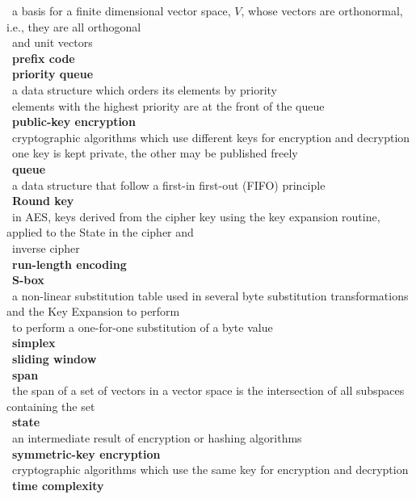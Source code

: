 \documentclass[10pt,letterpaper]{scrartcl}
\newcommand{\tbul}{\textbullet}
\newcommand{\tend}{\>\textendash}
\begin{document}
\begin{tabbing}
\begin{tabbing}
    \tend\ a basis for a finite dimensional vector space, $V$, whose vectors are orthonormal, i.e., they are all orthogonal \\ \>\ and unit vectors \\
\tbul\ \textbf{prefix code} \\
\tbul\ \textbf{priority queue} \\
    \tend\ a data structure which orders its elements by priority \\
    \tend\ elements with the highest priority are at the front of the queue \\
\tbul\ \textbf{public-key encryption} \\
    \tend\ cryptographic algorithms which use different keys for encryption and decryption \\
    \tend\ one key is kept private, the other may be published freely \\
\tbul\ \textbf{queue} \\
    \tend\ a data structure that follow a first-in first-out (FIFO) principle \\
\tbul\ \textbf{Round key} \\
    \tend\ in AES, keys derived from the cipher key using the key expansion routine, applied to the State in the cipher and \\ \>\ inverse cipher \\
\tbul\ \textbf{run-length encoding} \\
\tbul\ \textbf{S-box} \\
    \tend\ a non-linear substitution table used in several byte substitution transformations and the Key Expansion to perform \\ \>\ to perform a one-for-one substitution of a byte value \\
\tbul\ \textbf{simplex} \\
\tbul\ \textbf{sliding window} \\
\tbul\ \textbf{span} \\
    \tend\ the span of a set of vectors in a vector space is the intersection of all subspaces containing the set \\
\tbul\ \textbf{state} \\
    \tend\ an intermediate result of encryption or hashing algorithms \\
\tbul\ \textbf{symmetric-key encryption} \\
    \tend\ cryptographic algorithms which use the same key for encryption and decryption \\
\tbul\ \textbf{time complexity} \\

\end{tabbing}
\end{tabbing}
\end{document}
